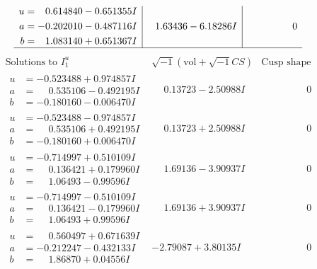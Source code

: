 \documentclass[1p]{elsarticle_modified}
\theoremstyle{definition}
\newcommand{\I}{\sqrt{-1}}
\begin{document}
$$\begin{array}{c|c|c}
\begin{aligned}
u &= \phantom{-}0.614840 - 0.651355 I \\
a &= -0.202010 - 0.487116 I \\
b &= \phantom{-}1.083140 + 0.651367 I\end{aligned}
 & \phantom{-}1.63436 - 6.18286 I & \phantom{-0.000000 } 0\\
 \hline 
 \end{array}$$\newpage$$\begin{array}{c|c|c}  
\text{Solutions to }I^u_{1}& \I (\text{vol} + \sqrt{-1}CS) & \text{Cusp shape}\\
 \hline 
\begin{aligned}
u &= -0.523488 + 0.974857 I \\
a &= \phantom{-}0.535106 - 0.492195 I \\
b &= -0.180160 - 0.006470 I\end{aligned}
 & \phantom{-}0.13723 - 2.50988 I & \phantom{-0.000000 } 0 \\ \hline\begin{aligned}
u &= -0.523488 - 0.974857 I \\
a &= \phantom{-}0.535106 + 0.492195 I \\
b &= -0.180160 + 0.006470 I\end{aligned}
 & \phantom{-}0.13723 + 2.50988 I & \phantom{-0.000000 } 0 \\ \hline\begin{aligned}
u &= -0.714997 + 0.510109 I \\
a &= \phantom{-}0.136421 + 0.179960 I \\
b &= \phantom{-}1.06493 - 0.99596 I\end{aligned}
 & \phantom{-}1.69136 - 3.90937 I & \phantom{-0.000000 } 0 \\ \hline\begin{aligned}
u &= -0.714997 - 0.510109 I \\
a &= \phantom{-}0.136421 - 0.179960 I \\
b &= \phantom{-}1.06493 + 0.99596 I\end{aligned}
 & \phantom{-}1.69136 + 3.90937 I & \phantom{-0.000000 } 0 \\ \hline\begin{aligned}
u &= \phantom{-}0.560497 + 0.671639 I \\
a &= -0.212247 - 0.432133 I \\
b &= \phantom{-}1.86870 + 0.04556 I\end{aligned}
 & -2.79087 + 3.80135 I & \phantom{-0.000000 } 0 \\ \hline\begin{aligned}

\end{aligned}
\end{array}$$
\end{document}
